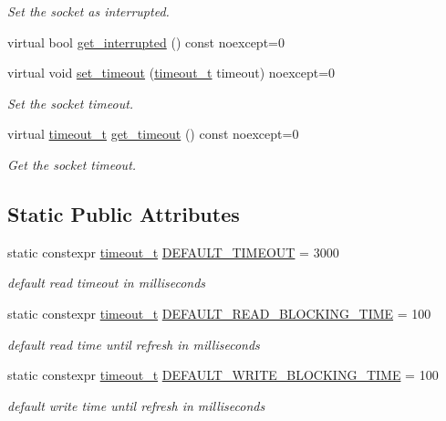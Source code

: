 \begin{DoxyCompactItemize}
\begin{DoxyCompactList}\small\item\em Set the socket as interrupted. \end{DoxyCompactList}\item 
virtual bool \hyperlink{structdevfix_1_1net_1_1socket_a61d5db2ef1bff2b54fc8d5d9d27a2bbc}{get\+\_\+interrupted} () const noexcept=0
\item 
virtual void \hyperlink{structdevfix_1_1net_1_1socket_ae1cf3b2c4f5d39225d6585c387f967d5}{set\+\_\+timeout} (\hyperlink{structdevfix_1_1net_1_1socket_a80a3bf4cb7292bae31ea9c6575539c68}{timeout\+\_\+t} timeout) noexcept=0
\begin{DoxyCompactList}\small\item\em Set the socket timeout. \end{DoxyCompactList}\item 
virtual \hyperlink{structdevfix_1_1net_1_1socket_a80a3bf4cb7292bae31ea9c6575539c68}{timeout\+\_\+t} \hyperlink{structdevfix_1_1net_1_1socket_afac86b6ad30a758ce590e7a144764967}{get\+\_\+timeout} () const noexcept=0
\begin{DoxyCompactList}\small\item\em Get the socket timeout. \end{DoxyCompactList}\end{DoxyCompactItemize}
\subsection*{Static Public Attributes}
\begin{DoxyCompactItemize}
\item 
static constexpr \hyperlink{structdevfix_1_1net_1_1socket_a80a3bf4cb7292bae31ea9c6575539c68}{timeout\+\_\+t} \hyperlink{structdevfix_1_1net_1_1socket_a1bd6468be497aed208ad6d5632683a5d}{D\+E\+F\+A\+U\+L\+T\+\_\+\+T\+I\+M\+E\+O\+UT} = 3000
\begin{DoxyCompactList}\small\item\em default read timeout in milliseconds \end{DoxyCompactList}\item 
static constexpr \hyperlink{structdevfix_1_1net_1_1socket_a80a3bf4cb7292bae31ea9c6575539c68}{timeout\+\_\+t} \hyperlink{structdevfix_1_1net_1_1socket_a77c3214eb436d06825a4cc2aafcc63ce}{D\+E\+F\+A\+U\+L\+T\+\_\+\+R\+E\+A\+D\+\_\+\+B\+L\+O\+C\+K\+I\+N\+G\+\_\+\+T\+I\+ME} = 100
\begin{DoxyCompactList}\small\item\em default read time until refresh in milliseconds \end{DoxyCompactList}\item 
static constexpr \hyperlink{structdevfix_1_1net_1_1socket_a80a3bf4cb7292bae31ea9c6575539c68}{timeout\+\_\+t} \hyperlink{structdevfix_1_1net_1_1socket_a57ab1333bbc83d51468d33e11042f107}{D\+E\+F\+A\+U\+L\+T\+\_\+\+W\+R\+I\+T\+E\+\_\+\+B\+L\+O\+C\+K\+I\+N\+G\+\_\+\+T\+I\+ME} = 100
\begin{DoxyCompactList}\small\item\em default write time until refresh in milliseconds \end{DoxyCompactList}\end{DoxyCompactItemize}



